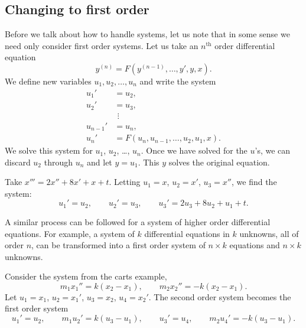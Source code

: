 \subsection{Changing to first order}

Before we talk about how to handle systems, let us note that
in some sense
we need only consider first order systems.
Let us
take an $n^{\text{th}}$ order differential equation
\begin{equation*}
y^{(n)} = F(y^{(n-1)},\ldots,y',y,x) .
\end{equation*}
We define new variables $u_1, u_2, \ldots, u_n$ and write the system
\begin{align*}
u_1' & = u_2 , \\
u_2' & = u_3 , \\
& ~\, \vdots \\
u_{n-1}' & = u_n , \\
u_n' & = F(u_n,u_{n-1},\ldots,u_2,u_1,x) .
\end{align*}
We solve
this system for $u_1$, $u_2$, \ldots, $u_n$.  Once we have solved
for the $u$'s,
we can discard $u_2$ through $u_n$ and let $y = u_1$.
This $y$ solves the original equation.

\begin{example}
Take $x''' = 2x''+ 8x' + x + t$.  Letting $u_1 = x$, $u_2 = x'$, $u_3
= x''$, we find the system:
\begin{equation*}
u_1' = u_2, \qquad u_2' = u_3, \qquad u_3' = 2u_3 + 8u_2 + u_1 + t .
\end{equation*}
\end{example}

A similar process can be followed for a system of higher order differential
equations.  For example, a system of $k$ differential equations in $k$
unknowns, all of order $n$, can be transformed into a first
order system of $n \times k$
equations and $n \times k$ unknowns.

\begin{example}
Consider the system from the carts example,
\begin{equation*}
m_1 x_1''  = k(x_2-x_1), \qquad m_2 x_2'' = - k(x_2-x_1) .
\end{equation*}
Let $u_1 = x_1$, $u_2 = x_1'$, 
$u_3 = x_2$, $u_4 = x_2'$.  The second order system becomes the
first order system
\begin{equation*}
u_1' = u_2, \qquad
m_1 u_2'  = k(u_3-u_1), \qquad
u_3' = u_4, \qquad
m_2 u_4' = - k(u_3-u_1) .
\end{equation*}
\end{example}

